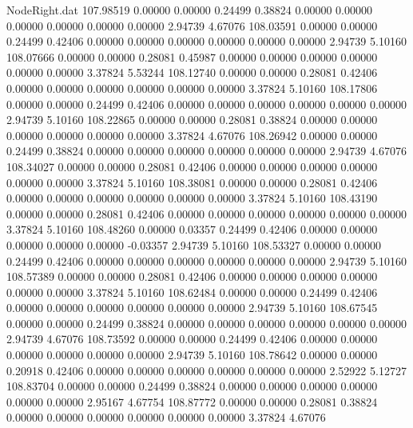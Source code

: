 \begin{filecontents}{NodeRight.dat}
 107.98519    0.00000    0.00000     0.24499    0.38824    0.00000    0.00000    0.00000    0.00000    0.00000    0.00000    2.94739    4.67076
 108.03591    0.00000    0.00000     0.24499    0.42406    0.00000    0.00000    0.00000    0.00000    0.00000    0.00000    2.94739    5.10160
 108.07666    0.00000    0.00000     0.28081    0.45987    0.00000    0.00000    0.00000    0.00000    0.00000    0.00000    3.37824    5.53244
 108.12740    0.00000    0.00000     0.28081    0.42406    0.00000    0.00000    0.00000    0.00000    0.00000    0.00000    3.37824    5.10160
 108.17806    0.00000    0.00000     0.24499    0.42406    0.00000    0.00000    0.00000    0.00000    0.00000    0.00000    2.94739    5.10160
 108.22865    0.00000    0.00000     0.28081    0.38824    0.00000    0.00000    0.00000    0.00000    0.00000    0.00000    3.37824    4.67076
 108.26942    0.00000    0.00000     0.24499    0.38824    0.00000    0.00000    0.00000    0.00000    0.00000    0.00000    2.94739    4.67076
 108.34027    0.00000    0.00000     0.28081    0.42406    0.00000    0.00000    0.00000    0.00000    0.00000    0.00000    3.37824    5.10160
 108.38081    0.00000    0.00000     0.28081    0.42406    0.00000    0.00000    0.00000    0.00000    0.00000    0.00000    3.37824    5.10160
 108.43190    0.00000    0.00000     0.28081    0.42406    0.00000    0.00000    0.00000    0.00000    0.00000    0.00000    3.37824    5.10160
 108.48260    0.00000    0.03357     0.24499    0.42406    0.00000    0.00000    0.00000    0.00000    0.00000   -0.03357    2.94739    5.10160
 108.53327    0.00000    0.00000     0.24499    0.42406    0.00000    0.00000    0.00000    0.00000    0.00000    0.00000    2.94739    5.10160
 108.57389    0.00000    0.00000     0.28081    0.42406    0.00000    0.00000    0.00000    0.00000    0.00000    0.00000    3.37824    5.10160
 108.62484    0.00000    0.00000     0.24499    0.42406    0.00000    0.00000    0.00000    0.00000    0.00000    0.00000    2.94739    5.10160
 108.67545    0.00000    0.00000     0.24499    0.38824    0.00000    0.00000    0.00000    0.00000    0.00000    0.00000    2.94739    4.67076
 108.73592    0.00000    0.00000     0.24499    0.42406    0.00000    0.00000    0.00000    0.00000    0.00000    0.00000    2.94739    5.10160
 108.78642    0.00000    0.00000     0.20918    0.42406    0.00000    0.00000    0.00000    0.00000    0.00000    0.00000    2.52922    5.12727
 108.83704    0.00000    0.00000     0.24499    0.38824    0.00000    0.00000    0.00000    0.00000    0.00000    0.00000    2.95167    4.67754
 108.87772    0.00000    0.00000     0.28081    0.38824    0.00000    0.00000    0.00000    0.00000    0.00000    0.00000    3.37824    4.67076

\end{filecontents}
